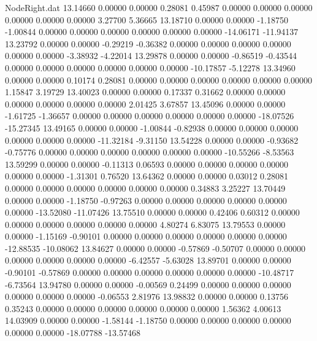 \begin{filecontents}{NodeRight.dat}
  13.14660    0.00000    0.00000     0.28081    0.45987    0.00000    0.00000    0.00000    0.00000    0.00000    0.00000    3.27700    5.36665
  13.18710    0.00000    0.00000    -1.18750   -1.00844    0.00000    0.00000    0.00000    0.00000    0.00000    0.00000  -14.06171  -11.94137
  13.23792    0.00000    0.00000    -0.29219   -0.36382    0.00000    0.00000    0.00000    0.00000    0.00000    0.00000   -3.38932   -4.22014
  13.29878    0.00000    0.00000    -0.86519   -0.43544    0.00000    0.00000    0.00000    0.00000    0.00000    0.00000  -10.17857   -5.12278
  13.34960    0.00000    0.00000     0.10174    0.28081    0.00000    0.00000    0.00000    0.00000    0.00000    0.00000    1.15847    3.19729
  13.40023    0.00000    0.00000     0.17337    0.31662    0.00000    0.00000    0.00000    0.00000    0.00000    0.00000    2.01425    3.67857
  13.45096    0.00000    0.00000    -1.61725   -1.36657    0.00000    0.00000    0.00000    0.00000    0.00000    0.00000  -18.07526  -15.27345
  13.49165    0.00000    0.00000    -1.00844   -0.82938    0.00000    0.00000    0.00000    0.00000    0.00000    0.00000  -11.32184   -9.31150
  13.54228    0.00000    0.00000    -0.93682   -0.75776    0.00000    0.00000    0.00000    0.00000    0.00000    0.00000  -10.55266   -8.53563
  13.59299    0.00000    0.00000    -0.11313    0.06593    0.00000    0.00000    0.00000    0.00000    0.00000    0.00000   -1.31301    0.76520
  13.64362    0.00000    0.00000     0.03012    0.28081    0.00000    0.00000    0.00000    0.00000    0.00000    0.00000    0.34883    3.25227
  13.70449    0.00000    0.00000    -1.18750   -0.97263    0.00000    0.00000    0.00000    0.00000    0.00000    0.00000  -13.52080  -11.07426
  13.75510    0.00000    0.00000     0.42406    0.60312    0.00000    0.00000    0.00000    0.00000    0.00000    0.00000    4.80274    6.83075
  13.79553    0.00000    0.00000    -1.15169   -0.90101    0.00000    0.00000    0.00000    0.00000    0.00000    0.00000  -12.88535  -10.08062
  13.84627    0.00000    0.00000    -0.57869   -0.50707    0.00000    0.00000    0.00000    0.00000    0.00000    0.00000   -6.42557   -5.63028
  13.89701    0.00000    0.00000    -0.90101   -0.57869    0.00000    0.00000    0.00000    0.00000    0.00000    0.00000  -10.48717   -6.73564
  13.94780    0.00000    0.00000    -0.00569    0.24499    0.00000    0.00000    0.00000    0.00000    0.00000    0.00000   -0.06553    2.81976
  13.98832    0.00000    0.00000     0.13756    0.35243    0.00000    0.00000    0.00000    0.00000    0.00000    0.00000    1.56362    4.00613
  14.03909    0.00000    0.00000    -1.58144   -1.18750    0.00000    0.00000    0.00000    0.00000    0.00000    0.00000  -18.07788  -13.57468

\end{filecontents}
